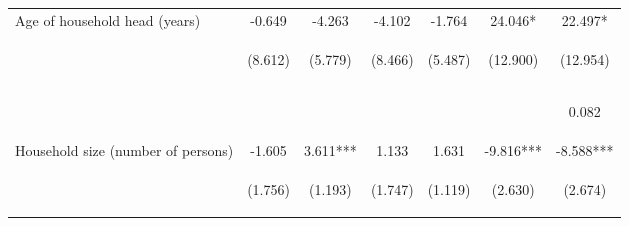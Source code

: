 \begin{center}
\begin{tabular}{lcccccc}
Age of household head (years) & -0.649 & -4.263 & -4.102 & -1.764 & 24.046* & 22.497* \\
 & \begin{footnotesize}(8.612)\end{footnotesize} & \begin{footnotesize}(5.779)\end{footnotesize} & \begin{footnotesize}(8.466)\end{footnotesize} & \begin{footnotesize}(5.487)\end{footnotesize} & \begin{footnotesize}(12.900)\end{footnotesize} & \begin{footnotesize}(12.954)\end{footnotesize} \\
\vspace{4pt} & \begin{footnotesize}[0.940]\end{footnotesize} & \begin{footnotesize}[0.461]\end{footnotesize} & \begin{footnotesize}[0.628]\end{footnotesize} & \begin{footnotesize}[0.748]\end{footnotesize} & \begin{footnotesize}[0.062]\end{footnotesize} & \begin{footnotesize}0.082\end{footnotesize} \\
Household size (number of persons) & -1.605 & 3.611*** & 1.133 & 1.631 & -9.816*** & -8.588*** \\
 & \begin{footnotesize}(1.756)\end{footnotesize} & \begin{footnotesize}(1.193)\end{footnotesize} & \begin{footnotesize}(1.747)\end{footnotesize} & \begin{footnotesize}(1.119)\end{footnotesize} & \begin{footnotesize}(2.630)\end{footnotesize} & \begin{footnotesize}(2.674)\end{footnotesize} \\

\end{tabular}
\end{center}
